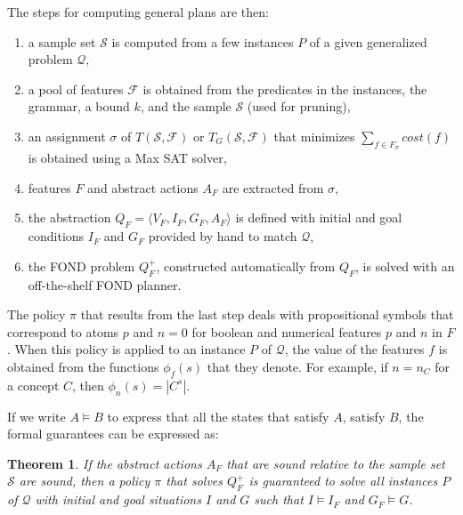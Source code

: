 \documentclass[letterpaper]{article} %
\newcommand{\tup}[1]{\langle #1 \rangle}
\newtheorem{theorem}[definition]{Theorem}
\newcommand{\Q}{\mathcal{Q}}
\newcommand{\F}{\mathcal{F}}
\renewcommand{\S}{\mathcal{S}}
\begin{document}
The steps for computing general plans are then:
\begin{enumerate}[1.]
  \item a sample set $\S$ is computed from a few instances $P$ of a given
    generalized problem $\Q$,
  \item a pool of features $\F$ is obtained from the predicates in the instances, %
    the grammar, a  bound $k$, and the sample $\S$ (used for
    pruning),
  \item an assignment $\sigma$ of $T(\S,\F)$ or $T_G(\S,\F)$
    that minimizes $\sum_{f \in F_{\sigma}} cost(f)$ is obtained using a
    Max SAT solver,
  \item features $F$ and abstract actions $A_F$ are extracted from $\sigma$,
  \item the abstraction $Q_F=\tup{V_F,I_F,G_F,A_F}$ is defined with initial and goal
    conditions $I_F$ and $G_F$ provided by hand to match $\Q$,
  \item the FOND problem $Q^+_F$, constructed automatically from $Q_F$, is solved with an off-the-shelf
    FOND planner.
\end{enumerate}

The policy $\pi$ that results from the last step deals with propositional symbols that correspond to atoms $p$ and $n=0$ for boolean
and numerical features $p$ and $n$ in $F$. When this policy is applied to an instance $P$ of $\Q$, the  value of the features $f$
is obtained from the functions $\phi_f(s)$ that they denote. For example, if $n=n_C$ for a concept $C$, then $\phi_{n}(s)=|C^s|$.

If we write $A \vDash B$ to express that all the states that satisfy $A$, satisfy $B$,
the formal guarantees can be expressed as:

\begin{theorem}
If the abstract actions $A_F$ that are sound relative to the sample set $\S$  are  sound,
then a   policy $\pi$ that solves  $Q^+_F$  is guaranteed to solve  all instances $P$ of $\Q$
with initial and goal situations $I$ and $G$ such that $I \vDash  I_F$ and $G_F \vDash G$.
\end{theorem}

\end{document}
